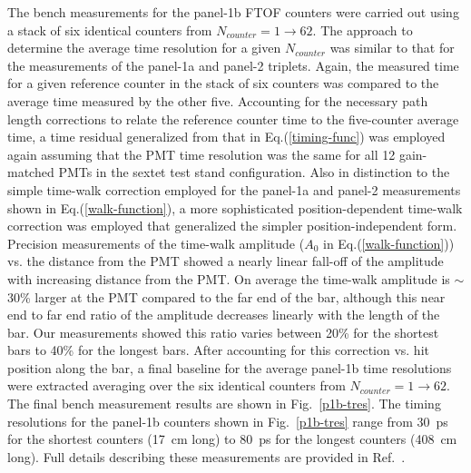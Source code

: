 \documentclass{elsart}
\begin{document}
The bench measurements for the panel-1b FTOF counters were carried out using a stack of six identical
counters from $N_{counter} = 1 \to 62$. The approach to determine the average time resolution for a given
$N_{counter}$ was similar to that for the measurements of the panel-1a and panel-2 triplets. Again, the 
measured time for a given reference counter in the stack of six counters was compared to the average time
measured by the other five. Accounting for the necessary path length corrections to relate the reference
counter time to the five-counter average time, a time residual generalized from that in Eq.(\ref{timing-func})
was employed again assuming that the PMT time resolution was the same for all 12 gain-matched PMTs in the
sextet test stand configuration. Also in distinction to the simple time-walk correction employed for the panel-1a
and panel-2 measurements shown in Eq.(\ref{walk-function}), a more sophisticated position-dependent time-walk
correction was employed that generalized the simpler position-independent form. Precision measurements of the
time-walk amplitude ($A_0$ in Eq.(\ref{walk-function})) vs. the distance from the PMT showed a nearly linear
fall-off of the amplitude with increasing distance from the PMT. On average the time-walk amplitude is $\sim$30\%
larger at the PMT compared to the far end of the bar, although this near end to far end ratio of the amplitude
decreases linearly with the length of the bar. Our measurements showed this ratio varies between 20\% for the
shortest bars to 40\% for the longest bars. After accounting for this correction vs. hit position along the bar, a
final baseline for the average panel-1b time resolutions were extracted averaging over the six identical counters
from $N_{counter} = 1 \to 62$. The final bench measurement results are shown in Fig.~\ref{p1b-tres}. The timing
resolutions for the panel-1b counters shown in Fig.~\ref{p1b-tres} range from 30~ps for the shortest counters 
(17~cm long) to 80~ps for the longest counters (408~cm long). Full details describing these measurements are
provided in Ref.~\cite{nim-p1b}.
\end{document}
